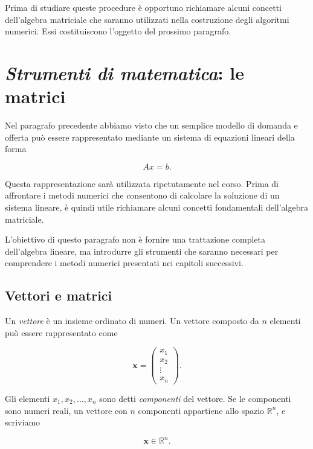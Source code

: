 Prima di studiare queste procedure è opportuno richiamare alcuni
concetti dell'algebra matriciale che saranno utilizzati nella
costruzione degli algoritmi numerici. Essi costituiscono l'oggetto
del prossimo paragrafo.

\section{\textit{\textbf{Strumenti di matematica}}: le matrici}


Nel paragrafo precedente abbiamo visto che un semplice modello di
domanda e offerta può essere rappresentato mediante un sistema di
equazioni lineari della forma

\begin{equation*}
    Ax=b.
    \label{eq:sistema_lineare}
\end{equation*}

Questa rappresentazione sarà utilizzata ripetutamente nel corso.
Prima di affrontare i metodi numerici che consentono di calcolare
la soluzione di un sistema lineare, è quindi utile richiamare alcuni
concetti fondamentali dell'algebra matriciale.

L'obiettivo di questo paragrafo non è fornire una trattazione completa
dell'algebra lineare, ma introdurre gli strumenti che saranno
necessari per comprendere i metodi numerici presentati nei capitoli
successivi.


\subsection{Vettori e matrici}

Un \emph{vettore} è un insieme ordinato di numeri. 
Un vettore composto da $n$ elementi può essere rappresentato come

\begin{equation*}
\mathbf{x} =
\begin{pmatrix}
x_1 \\
x_2 \\
\vdots \\
x_n
\end{pmatrix}.
\end{equation*}

Gli elementi $x_1,x_2,\ldots,x_n$ sono detti \emph{componenti}
del vettore. Se le componenti sono numeri reali, un vettore con
$n$ componenti appartiene allo spazio $\mathbb{R}^n$, e scriviamo

\begin{equation*}
\mathbf{x} \in \mathbb{R}^n.
\end{equation*}


